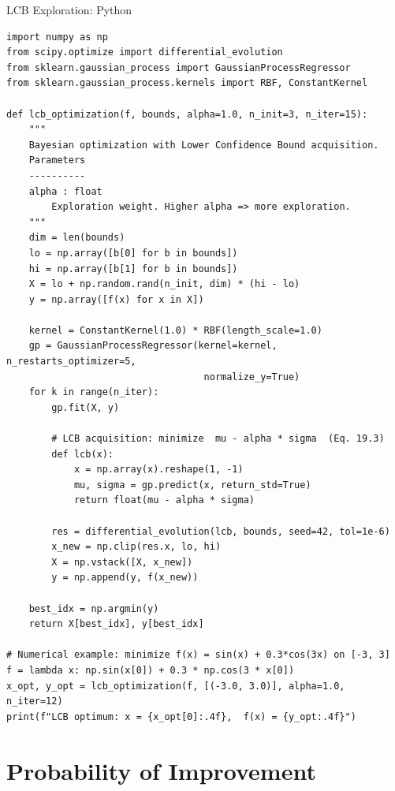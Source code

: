 \documentclass[aspectratio=169,10pt]{beamer}
\begin{document}
\begin{frame}[fragile]{LCB Exploration: Python}
\begin{lstlisting}[caption={Lower Confidence Bound acquisition function (Python)}]
import numpy as np
from scipy.optimize import differential_evolution
from sklearn.gaussian_process import GaussianProcessRegressor
from sklearn.gaussian_process.kernels import RBF, ConstantKernel

def lcb_optimization(f, bounds, alpha=1.0, n_init=3, n_iter=15):
    """
    Bayesian optimization with Lower Confidence Bound acquisition.
    Parameters
    ----------
    alpha : float
        Exploration weight. Higher alpha => more exploration.
    """
    dim = len(bounds)
    lo = np.array([b[0] for b in bounds])
    hi = np.array([b[1] for b in bounds])
    X = lo + np.random.rand(n_init, dim) * (hi - lo)
    y = np.array([f(x) for x in X])

    kernel = ConstantKernel(1.0) * RBF(length_scale=1.0)
    gp = GaussianProcessRegressor(kernel=kernel, n_restarts_optimizer=5,
                                   normalize_y=True)
    for k in range(n_iter):
        gp.fit(X, y)

        # LCB acquisition: minimize  mu - alpha * sigma  (Eq. 19.3)
        def lcb(x):
            x = np.array(x).reshape(1, -1)
            mu, sigma = gp.predict(x, return_std=True)
            return float(mu - alpha * sigma)

        res = differential_evolution(lcb, bounds, seed=42, tol=1e-6)
        x_new = np.clip(res.x, lo, hi)
        X = np.vstack([X, x_new])
        y = np.append(y, f(x_new))

    best_idx = np.argmin(y)
    return X[best_idx], y[best_idx]

# Numerical example: minimize f(x) = sin(x) + 0.3*cos(3x) on [-3, 3]
f = lambda x: np.sin(x[0]) + 0.3 * np.cos(3 * x[0])
x_opt, y_opt = lcb_optimization(f, [(-3.0, 3.0)], alpha=1.0, n_iter=12)
print(f"LCB optimum: x = {x_opt[0]:.4f},  f(x) = {y_opt:.4f}")
\end{lstlisting}
\end{frame}

\section{Probability of Improvement}
\end{document}
